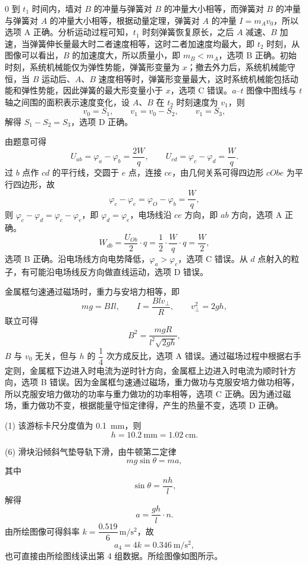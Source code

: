 \begin{answer}
0 到 $t_{1}$ 时间内，墙对 $B$ 的冲量与弹簧对 $B$ 的冲量大小相等，而弹簧对 $B$ 的冲量与弹簧对 $A$ 的冲量大小相等，根据动量定理，弹簧对 $A$ 的冲量 $I=m_{A}v_{0}$，所以选项 A 正确。分析运动过程可知，$t_{1}$ 时刻弹簧恢复原长，之后 $A$ 减速、$B$ 加速，当弹簧伸长量最大时二者速度相等，这时二者加速度均最大，即 $t_{2}$ 时刻，从图像可以看出，$B$ 的加速度大，所以质量小，即 $m_{B}<m_{A}$，选项 B 正确。初始时刻，系统机械能仅为弹性势能，弹簧形变量为 $x$；撤去外力后，系统机械能守恒，当 $B$ 运动后、$A$、$B$ 速度相等时，弹簧形变量最大，这时系统机械能包括动能和弹性势能，因此弹簧的最大形变量小于 $x$，选项 C 错误。$a$--$t$ 图像中图线与 $t$ 轴之间围的面积表示速度变化，设 $A$、$B$ 在 $t_{2}$ 时刻速度为 $v_{1}$，则
\[
  v_{0}=S_{1},\qquad v_{1}=v_{0}-S_{2},\qquad v_{1}=S_{3},
\]
解得 $S_{1}-S_{2}=S_{3}$，选项 D 正确。
\end{answer}

\begin{answer}
由题意可得
\[
  U_{ab}=\varphi_{a}-\varphi_{b}=\frac{2W}{q},\qquad
  U_{cd}=\varphi_{c}-\varphi_{d}=\frac{W}{q}.
\]
过 $b$ 点作 $cd$ 的平行线，交圆于 $e$ 点，连接 $ce$，由几何关系可得四边形 $cObe$ 为平行四边形，故
\[
  \varphi_{c}-\varphi_{e}=\varphi_{O}-\varphi_{b}=\frac{W}{q},
\]
则 $\varphi_{c}-\varphi_{d}=\varphi_{c}-\varphi_{e}$，即 $\varphi_{d}=\varphi_{e}$，电场线沿 $ce$ 方向，即 $ab$ 方向，选项 A 正确。
\[
  W_{db}=\frac{U_{Ob}}{2}\cdot q=\frac{1}{2}\cdot\frac{W}{q}\cdot q=\frac{W}{2},
\]
选项 B 正确。沿电场线方向电势降低，$\varphi_{a}>\varphi_{c}$，选项 C 错误。从 $d$ 点射入的粒子，有可能沿电场线反方向做直线运动，选项 D 错误。
\end{answer}

\begin{answer}
金属框匀速通过磁场时，重力与安培力相等，即
\[
  mg=BIl,\qquad I=\frac{Blv_{\bot}}{R},\qquad v_{\bot}^{2}=2gh,
\]
联立可得
\[
  B^{2}=\frac{mgR}{l^{2}\sqrt{2gh}},
\]
$B$ 与 $v_{0}$ 无关，但与 $h$ 的 $\dfrac{1}{4}$ 次方成反比，选项 A 错误。通过磁场过程中根据右手定则，金属框下边进入时电流为逆时针方向，金属框上边进入时电流为顺时针方向，选项 B 错误。因为金属框匀速通过磁场，重力做功与克服安培力做功相等，所以克服安培力做功的功率与重力做功的功率相等，选项 C 正确。因为通过磁场，重力做功不变，根据能量守恒定律得，产生的热量不变，选项 D 正确。
\end{answer}

\begin{answer}
(1) 该游标卡尺分度值为 \SI{0.1}{\milli\metre}，则
\[
  h=\SI{10.2}{\milli\metre}=\SI{1.02}{\centi\metre}.
\]

(6) 滑块沿倾斜气垫导轨下滑，由牛顿第二定律
\[
  mg\sin\theta=ma,
\]
其中
\[
  \sin\theta=\frac{nh}{l},
\]
解得
\[
  a=\frac{gh}{l}\cdot n.
\]
由所绘图像可得斜率 $k=\dfrac{0.519}{6}\,\si{\metre\per\second\squared}$，故
\[
  a_{4}=4k=\SI{0.346}{\metre\per\second\squared},
\]
也可直接由所绘图线读出第 4 组数据。所绘图像如图所示。

\end{answer}

